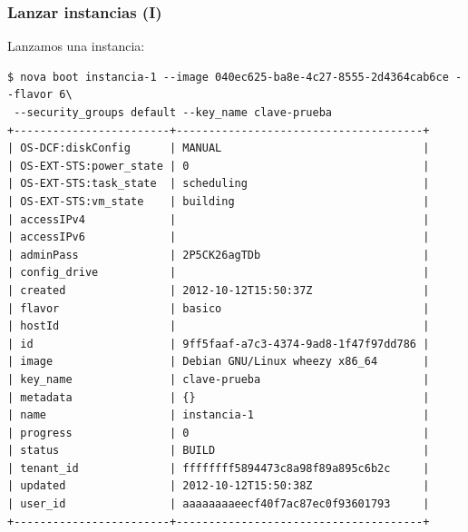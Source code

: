 \documentclass{beamer}
\begin{document}
\begin{frame}[fragile]
  \frametitle{Lanzar instancias (I)}
  Lanzamos una instancia:
\begin{lstlisting}[style=consola]
$ nova boot instancia-1 --image 040ec625-ba8e-4c27-8555-2d4364cab6ce --flavor 6\
 --security_groups default --key_name clave-prueba
+------------------------+--------------------------------------+
| OS-DCF:diskConfig      | MANUAL                               |
| OS-EXT-STS:power_state | 0                                    |
| OS-EXT-STS:task_state  | scheduling                           |
| OS-EXT-STS:vm_state    | building                             |
| accessIPv4             |                                      |
| accessIPv6             |                                      |
| adminPass              | 2P5CK26agTDb                         |
| config_drive           |                                      |
| created                | 2012-10-12T15:50:37Z                 |
| flavor                 | basico                               |
| hostId                 |                                      |
| id                     | 9ff5faaf-a7c3-4374-9ad8-1f47f97dd786 |
| image                  | Debian GNU/Linux wheezy x86_64       |
| key_name               | clave-prueba                         |
| metadata               | {}                                   |
| name                   | instancia-1                          |
| progress               | 0                                    |
| status                 | BUILD                                |
| tenant_id              | ffffffff5894473c8a98f89a895c6b2c     |
| updated                | 2012-10-12T15:50:38Z                 |
| user_id                | aaaaaaaaeecf40f7ac87ec0f93601793     |
+------------------------+--------------------------------------+
\end{lstlisting}
\end{frame}
\end{document}
